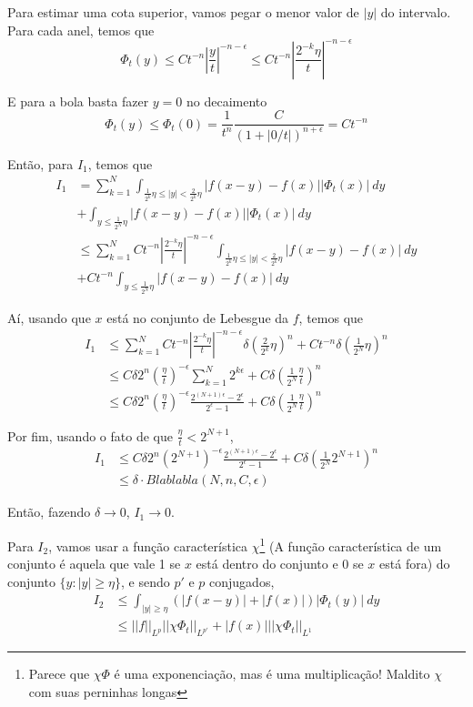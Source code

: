 \documentclass[11pt]{article}
\newcommand{\e}{\epsilon}
\newcommand{\norm}[2]{\left|\left|#1\right|\right|_{L^{#2}}}
\begin{document}
Para estimar uma cota superior, vamos pegar o menor valor de \(|y|\) do intervalo. Para cada anel, temos que 
\[\Phi_t(y) \leq Ct^{-n} \left|\frac{y}{t}\right|^{-n-\e} \leq Ct^{-n} \left|\frac{2^{-k}\eta}{t}\right|^{-n-\e}\]

E para a bola basta fazer \(y=0\) no decaimento \[\Phi_t(y) \leq \Phi_t(0) = \frac{1}{t^n}\frac{C}{ (1 + |0/t|)^{n + \e} } = Ct^{-n} \]

Então, para \(I_1\), temos que \begin{align*}
	I_1 &= \sum_{k=1}^{N} \int_{\frac{1}{2^k}\eta \leq |y| < \frac{2}{2^k}\eta} | f(x-y)- f(x)| |\Phi_t(x)| \ dy \\
	& + \int_{y \leq \frac{1}{2^N}\eta} | f(x-y)- f(x)| |\Phi_t(x)| \ dy \\
	&\leq \sum_{k=1}^{N} Ct^{-n} \left|\frac{2^{-k}\eta}{t}\right|^{-n-\e} \int_{\frac{1}{2^k}\eta \leq |y| < \frac{2}{2^k}\eta} | f(x-y)- f(x)|  \ dy \\  &+  Ct^{-n} \int_{y \leq \frac{1}{2^N}\eta} | f(x-y)- f(x)|  \ dy
\end{align*}

Aí, usando que \(x\) está no conjunto de Lebesgue da \(f\), temos que 
\begin{align*}
	I_1 &\leq \sum_{k=1}^{N} Ct^{-n} \left|\frac{2^{-k}\eta}{t}\right|^{-n-\e} \delta \left(\frac{2}{2^k}\eta \right)^n +  Ct^{-n} \delta \left(\frac{1}{2^N}\eta\right)^n\\
	&\leq C\delta 2^n \left(\frac{\eta}{t}\right)^{-\e }\sum_{k=1}^{N} 2^{k\e } + C \delta \left(\frac{1}{2^N}\frac{\eta}{t}\right)^n\\
	&\leq C\delta 2^n \left(\frac{\eta}{t}\right)^{-\e } \frac{2^{(N+1)\e} - 2^\e}{2^\e - 1} + C \delta \left(\frac{1}{2^N}\frac{\eta}{t}\right)^n
\end{align*}

Por fim, usando o fato de que \( \frac{\eta}{t}  < 2^{N+1}\), \begin{align*}
	I_1 &\leq C\delta 2^n \left(2^{N+1}\right)^{-\e } \frac{2^{(N+1)\e} - 2^\e}{2^\e - 1} + C \delta \left(\frac{1}{2^N}2^{N+1}\right)^n\\
	&\leq \delta \cdot Blablabla(N, n,C, \e )
\end{align*}

Então, fazendo \(\delta \rightarrow 0 \), \(I_1 \rightarrow 0\).

Para \(I_2\), vamos usar a função característica \(\chi\)\footnote{Parece que \(\chi\Phi\) é uma exponenciação, mas é uma multiplicação! Maldito \(\chi\) com suas perninhas longas} (A função característica de um conjunto é aquela que vale 1 se \(x\) está dentro do conjunto e \(0\) se \(x\) está fora) do conjunto \(\{y: |y| \geq \eta \}\), e sendo \(p'\) e \(p\) conjugados, \begin{align*}
	I_2 &\leq \int_{|y|\geq \eta} \left(|f(x-y)| + |f(x)|\right) |\Phi_t(y)|\ dy \\
	&\leq \norm{f}{p}\norm{\chi \Phi_t}{p'} + | f(x) | \norm{\chi \Phi_t}{1}
\end{align*}
\end{document}
